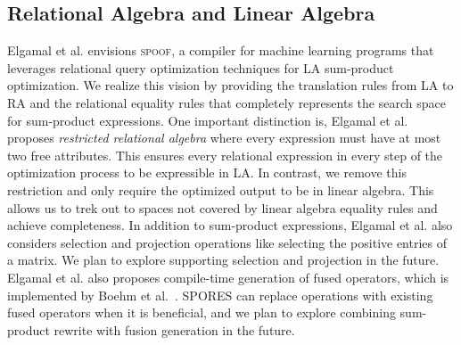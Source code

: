 
\subsection{Relational Algebra and Linear Algebra}
Elgamal et al. \cite{ElgamalLBETRS17} envisions \textsc{spoof}, a compiler for machine learning programs
that leverages relational query optimization techniques for LA sum-product optimization. 
We realize this vision by providing the translation
rules from LA to RA and the relational equality rules that completely represents
the search space for sum-product expressions. One important distinction is, Elgamal
et al. proposes \emph{restricted relational algebra} where every expression must
have at most two free attributes. This ensures every relational expression in every step of the
optimization process to be expressible in LA. In contrast, we remove this restriction and only require the 
optimized output to be in linear algebra. This allows us to trek out to spaces not
covered by linear algebra equality rules and achieve completeness. In addition 
to sum-product expressions, Elgamal et al. also considers selection and projection operations
like selecting the positive entries of a matrix. We plan to explore supporting
selection and projection in the future. Elgamal et al. also proposes compile-time generation of
fused operators, which is implemented by Boehm et al.~\cite{DBLP:journals/pvldb/BoehmRHSEP18}.
SPORES can replace operations with existing fused operators when it is beneficial, and we
plan to explore combining sum-product rewrite with fusion generation in the future. 

